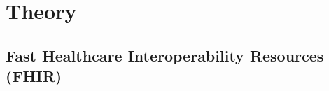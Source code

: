 \section{Theory}\label{sec:theory}
\subsection{Fast Healthcare Interoperability Resources (FHIR)}



